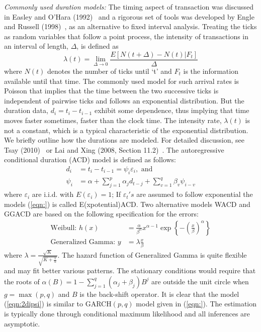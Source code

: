 \noindent \textit{Commonly used duration models:} The timing aspect of transaction was discussed in Easley and O'Hara (1992)~\cite{easley1992} and a rigorous set of tools was developed by Engle and Russell (1998)~\cite{engle1998}, as an alternative to fixed interval analysis. Treating the ticks as random variables that follow a point process, the intensity of transactions in an interval of length, $\Delta$, is defined as
	\begin{equation}\label{eqn:2lambda}
	\lambda(t) = \lim\limits_{\Delta \rightarrow 0}\frac{E[N(t+\Delta) - N(t)|F_t]}{\Delta}
	\end{equation}
where $N(t)$ denotes the number of ticks until `t' and $F_t$ is the information available until that time. The commonly used model for such arrival rates is Poisson that implies that the time between the two successive ticks is independent of pairwise ticks and follows an exponential distribution. But the duration data, $d_i = t_i - t_{i-1}$ exhibit some dependence, thus implying that time moves faster sometimes, faster than the clock time. The intensity rate, $\lambda(t)$ is not a constant, which is a typical characteristic of the exponential distribution. We briefly outline how the durations are modeled. For detailed discussion, see Tsay (2010)~\cite{tsay} or Lai and Xing (2008, Section 11.2)~\cite{lai1}. The autoregressive conditional duration (ACD) model is defined as follows:
	\begin{equation}\label{eqn:2dipsi}
	\begin{split}
	d_i&= t_i - t_{i-1} = \psi_i\varepsilon_i, \text{ and} \\
	\psi_i&= \alpha + \sum_{j=1}^p\alpha_j d_{t-j} + \sum_{v=1}^q\beta_v\psi_{i-v}
	\end{split}
	\end{equation}
where $\varepsilon_i$ are i.i.d. with $E(\varepsilon_i) = 1$; If $\varepsilon_t's$ are assumed to follow exponential the models (\ref{eqn:}) is called E(xpotential)ACD. Two alternative models WACD and GGACD are based on the following specification for the errors:
	\[
	\begin{split}
	\text{Weibull: }h(x) &= \frac{\alpha}{\beta^{\alpha}}x^{\alpha-1}\exp\left\{-(\frac{x}{\beta})^{\alpha}\right\} \\
	\text{Generalized Gamma: } y &= \lambda\frac{x}{\beta}
	\end{split}
	\]
where $\lambda = \frac{\sqrt{K}}{\sqrt{K+\frac{1}{\alpha}}}$. The hazard function of Generalized Gamma is quite flexible and may fit better various patterns. The stationary conditions would require that the roots of $\alpha(B) = 1 - \sum_{j=1}^q(\alpha_j+\beta_j)B^j$ are outside the unit circle when $g= \max(p,q)$ and $B$ is the back-shift operator. It is clear that the model (\ref{eqn:2dipsi}) is similar to GARCH$(p, q)$ model given in (\ref{eqn:}). The estimation is typically done through conditional maximum likelihood and all inferences are asymptotic.


